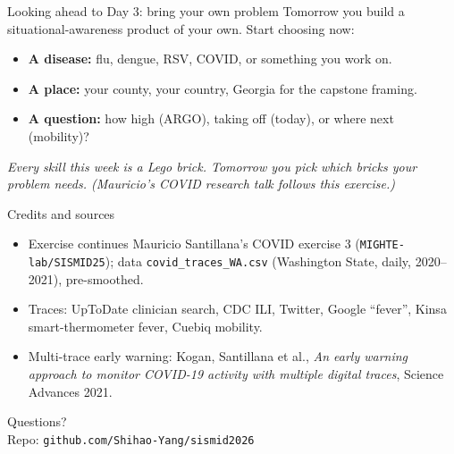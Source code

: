 \documentclass[aspectratio=169,11pt]{beamer}
\begin{document}
\begin{frame}{Looking ahead to Day 3: bring your own problem}
  Tomorrow you build a situational-awareness product of your own. Start choosing now:
  \begin{itemize}
    \item \textbf{A disease:} flu, dengue, RSV, COVID, or something you work on.
    \item \textbf{A place:} your county, your country, Georgia for the capstone framing.
    \item \textbf{A question:} how high (ARGO), taking off (today), or where next (mobility)?
  \end{itemize}
  \vspace{0.3em}
  \begin{center}
    \itshape Every skill this week is a Lego brick. Tomorrow you pick which bricks your
    problem needs. (Mauricio's COVID research talk follows this exercise.)
  \end{center}
\end{frame}

\begin{frame}{Credits and sources}
  \footnotesize
  \begin{itemize}
    \item Exercise continues Mauricio Santillana's COVID exercise 3
          (\texttt{MIGHTE-lab/SISMID25}); data \texttt{covid\_traces\_WA.csv} (Washington
          State, daily, 2020--2021), pre-smoothed.
    \item Traces: UpToDate clinician search, CDC ILI, Twitter, Google ``fever'', Kinsa
          smart-thermometer fever, Cuebiq mobility.
    \item Multi-trace early warning: Kogan, Santillana et al., \emph{An early warning
          approach to monitor COVID-19 activity with multiple digital traces}, Science
          Advances 2021.
  \end{itemize}
\end{frame}

\begin{frame}[standout]
  Questions?\\[0.4em]
  \small Repo: \texttt{github.com/Shihao-Yang/sismid2026}
\end{frame}
\end{document}
